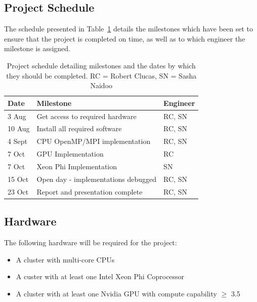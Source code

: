 \documentclass[10pt,twocolumn]{article}
\begin{document}
\subsection{Project Schedule}
The schedule presented in Table~\ref{tab:sched} details the milestones which have been set to ensure that the 
project is completed on time, as well as to which engineer the milestone is assigned.
\begin{table}[t!]
    \footnotesize
    \centering
    \caption{Project schedule detailing milestones and the dates by which they should be completed. RC =
    Robert Clucas, SN = Sasha Naidoo}
    \label{tab:sched}
    \vspace{0.2cm}
    \begin{tabular}{l l l}
        \hline  
        Date    & Milestone    & Engineer                                                          \\
        \hline
        \hline
        3 Aug   & Get access to required hardware       &       RC, SN                          \\
        10 Aug  & Install all required software         & RC, SN                          \\
        4 Sept  & CPU OpenMP/MPI implementation         & RC, SN                          \\
        7 Oct   & GPU Implementation                    & RC                                \\
        7 Oct   & Xeon Phi Implementation               & SN                              \\
        15 Oct  & Open day - implementations debugged   & RC, SN                            \\
        23 Oct  & Report and presentation complete      & RC, SN                           \\\hline
    \end{tabular}
\end{table}
\subsection{Hardware} \label{ssec:hware}

The following hardware will be required for the project:
\begin{itemize}[noitemsep]
    \item{A cluster with multi-core CPUs}
    \item{A custer with at least one Intel Xeon Phi Coprocessor}
    \item{A cluster with at least one Nvidia GPU with compute capability $\ge$ 3.5}
\end{itemize}
\end{document}
